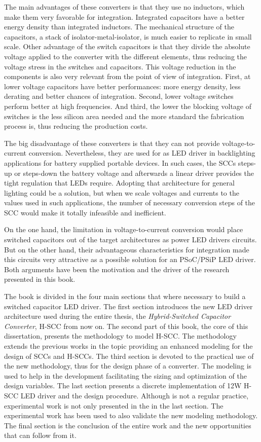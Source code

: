 The main advantages of these converters is that they use no inductors, which make them very favorable for integration. Integrated capacitors have a better energy density than integrated inductors. The mechanical structure of the capacitors, a stack of isolator-metal-isolator, is much easier to replicate in small scale.
Other advantage of the switch capacitors is that they divide the absolute voltage applied to the converter with the different elements, thus reducing the voltage stress in the switches and capacitors. This voltage reduction in the components is also very relevant from the point of view of integration. First, at lower voltage capacitors have better performances: more energy density, less derating and better chances of integration. Second, lower voltage switches perform better at high frequencies. And third, the lower the blocking voltage of switches is the less silicon area needed and the more standard the fabrication process is, thus reducing the production costs.

The big disadvantage of these converters is that they can not provide voltage-to-current conversion. Nevertheless, they are used for as LED driver in backlighting applications for battery supplied portable devices. In such cases, the SCCs steps-up or steps-down the battery voltage and afterwards a linear driver   provides the tight regulation that LEDs require. Adopting that architecture for general lighting could be a solution, but when we scale voltages and currents to the values used in such applications,  the number of necessary conversion steps of the SCC would make it totally infeasible and inefficient.

On the one hand, the limitation in voltage-to-current conversion would place switched capacitors out of the target architectures as power LED drivers circuits. But on the other hand, their advantageous characteristics for integration made this circuits very attractive as a possible solution for an PSoC/PSiP LED driver. Both arguments have been the motivation and the driver of the research presented in this book.

The book is divided in the four main sections that where necessary to build a switched capacitor LED driver. The first section introduces the new LED driver architecture used during the entire thesis, the \emph{Hybrid-Switched Capacitor Converter}, H-SCC from now on. The second part of this book, the core of this dissertation, presents the methodology to model H-SCC. The methodology extends the previous works in the topic providing an enhanced modeling for the design of SCCs and H-SCCs. The third section is devoted to the practical use of the new methodology, thus for the design phase of a converter. The modeling is used  to help in the development facilitating the sizing and optimization of the design variables. The last section presents a discrete implementation of 12W H-SCC LED driver and the design procedure. Although is not a regular practice, experimental work is not only presented in the in the last section. The experimental work has been used to also validate the new modeling methodology. The final section is the conclusion of the entire work and the new opportunities that can follow from it.


